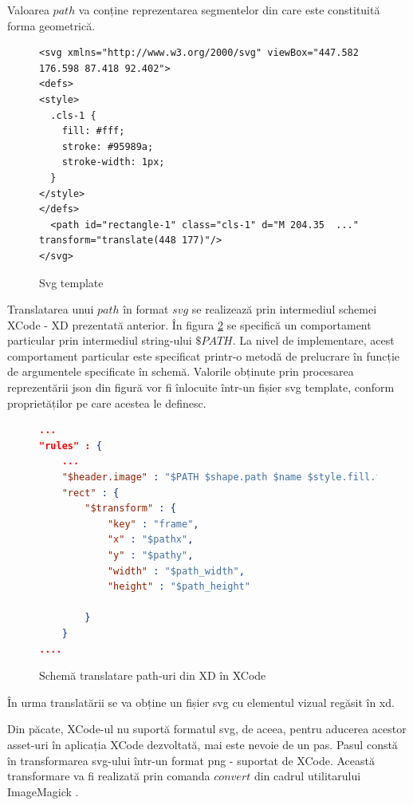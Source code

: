 Valoarea $path$ va conține reprezentarea segmentelor din care este constituită forma geometrică.

\begin{figure}[!htbp]
\lstset{language=XML}
\begin{lstlisting}
<svg xmlns="http://www.w3.org/2000/svg" viewBox="447.582 176.598 87.418 92.402">
<defs>
<style>
  .cls-1 {
    fill: #fff;
    stroke: #95989a;
    stroke-width: 1px;
  }
</style>
</defs>
  <path id="rectangle-1" class="cls-1" d="M 204.35  ..." transform="translate(448 177)"/>
</svg>
\end{lstlisting}
\caption{Svg template}\label{fig:svg}
\end{figure}

Translatarea unui $path$ în format $svg$ se realizează prin intermediul schemei XCode - XD prezentată anterior. În figura \ref{fig:PathExport} se specifică un comportament particular prin intermediul string-ului $\$PATH$. La nivel de implementare, acest comportament particular este specificat printr-o metodă de prelucrare în funcție de argumentele specificate în schemă. Valorile obținute prin procesarea reprezentării json din figură vor fi înlocuite într-un fișier svg template, conform proprietăților pe care acestea le definesc. 

\begin{figure}[!htbp]
\begin{lstlisting}[language=json,firstnumber=1]
...
"rules" : {
    ...
    "$header.image" : "$PATH $shape.path $name $style.fill.type $style.fill.color.value $transform $style.stroke.color.value $style.stroke.width",
    "rect" : {
        "$transform" : {
            "key" : "frame",
            "x" : "$pathx",
            "y" : "$pathy",
            "width" : "$path_width",
            "height" : "$path_height"
                        
        }
    }
....
\end{lstlisting}
\caption{Schemă translatare path-uri din XD în XCode} \label{fig:PathExport}
\end{figure}


În urma translatării se va obține un fișier svg cu elementul vizual regăsit în xd. 

Din păcate, XCode-ul nu suportă formatul svg, de aceea, pentru aducerea acestor asset-uri în aplicația XCode dezvoltată, mai este nevoie de un pas. Pasul constă în transformarea svg-ului într-un format png - suportat de XCode. Această transformare va fi realizată prin comanda $convert$ din cadrul utilitarului ImageMagick \cite{imageMagick}. 


